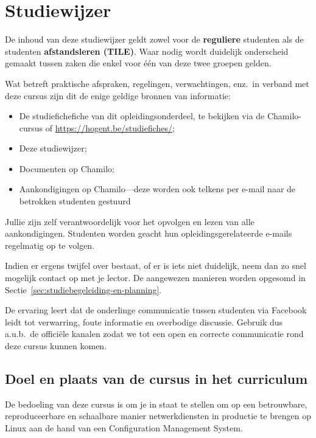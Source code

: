 \chapter{Studiewijzer}%
\label{ch:studiewijzer}

De inhoud van deze studiewijzer geldt zowel voor de \textbf{reguliere} studenten als de studenten \textbf{afstandsleren (TILE)}. Waar nodig wordt duidelijk onderscheid gemaakt tussen zaken die enkel voor één van deze twee groepen gelden.

Wat betreft praktische afspraken, regelingen, verwachtingen, enz.\ in
verband met deze cursus zijn dit de enige geldige bronnen van
informatie:

\begin{itemize}
  \item De studiefichefiche van dit opleidingsonderdeel, te bekijken via de Chamilo-cursus of \url{https://hogent.be/studiefiches/};
  \item Deze studiewijzer;
  \item Documenten op Chamilo;
  \item Aankondigingen op Chamilo---deze worden ook telkens per e-mail naar de betrokken studenten gestuurd
\end{itemize}

Jullie zijn zelf verantwoordelijk voor het opvolgen en lezen van alle aankondigingen. Studenten worden geacht hun opleidingsgerelateerde e-mails regelmatig op te volgen.

Indien er ergens twijfel over bestaat, of er is iets niet duidelijk, neem dan zo snel mogelijk contact op met je lector. De aangewezen manieren worden opgesomd in Sectie~\ref{sec:studiebegeleiding-en-planning}.

De ervaring leert dat de onderlinge communicatie tussen studenten via Facebook leidt tot verwarring, foute informatie en overbodige discussie. Gebruik dus a.u.b.~de officiële kanalen zodat we tot een open en correcte communicatie rond deze cursus kunnen komen.

\section{Doel en plaats van de cursus in het curriculum}%
\label{sec:doel-en-plaats}

De bedoeling van deze cursus is om je in staat te stellen om op een betrouwbare, reproduceerbare en schaalbare manier netwerkdiensten in productie te brengen op Linux aan de hand van een Configuration Management System.

